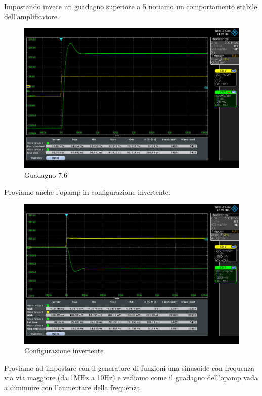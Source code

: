 Impostando invece un guadagno superiore a 5 notiamo un comportamento stabile dell'amplificatore.
\begin{figure}[H]
\centering
\includegraphics[width=\textwidth]{assets/exp8/Guadagno_7.6666_pt2.png}
\caption{Guadagno 7.6}
\end{figure}

Proviamo anche l'opamp in configurazione invertente.
\begin{figure}[H]
\centering
\includegraphics[width=\textwidth]{assets/exp8/invertente.png}
\caption{Configurazione invertente}
\end{figure}

Proviamo ad impostare con il generatore di funzioni una sinusoide con frequenza via via maggiore (da 1MHz a 10Hz) e vediamo come il guadagno dell'opamp vada a diminuire con l'aumentare della frequenza.

